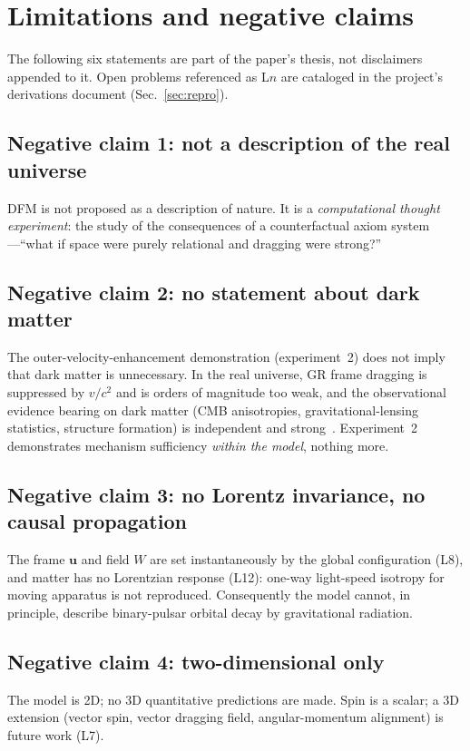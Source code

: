\documentclass[aps,reprint,amsmath,amssymb,nofootinbib,superscriptaddress,floatfix]{revtex4-2}
\newcommand{\vect}[1]{\bm{#1}}
\begin{document}
\section{Limitations and negative claims}
\label{sec:negative}

The following six statements are part of the paper's thesis, not
disclaimers appended to it.
Open problems referenced as L$n$ are cataloged in the project's
derivations document (Sec.~\ref{sec:repro}).

\subsection{Negative claim 1: not a description of the real universe}
DFM is not proposed as a description of nature.
It is a \emph{computational thought experiment}: the study of the
consequences of a
counterfactual axiom system---``what if space were purely relational
and dragging were strong?''

\subsection{Negative claim 2: no statement about dark matter}
The outer-velocity-enhancement demonstration (experiment~2) does not
imply that dark matter is unnecessary.
In the real universe, GR frame dragging is suppressed by $v/c^2$ and is
orders of magnitude too weak, and the observational evidence bearing on
dark matter (CMB anisotropies, gravitational-lensing statistics,
structure formation) is independent and
strong~\cite{Planck2018}.
Experiment~2 demonstrates mechanism sufficiency \emph{within the
model}, nothing more.

\subsection{Negative claim 3: no Lorentz invariance, no causal
propagation}
The frame $\vect{u}$ and field $W$ are set instantaneously by the
global configuration (L8), and matter has no Lorentzian response
(L12): one-way light-speed isotropy for moving apparatus is not
reproduced.
Consequently the model cannot, in principle, describe binary-pulsar
orbital decay by gravitational radiation.

\subsection{Negative claim 4: two-dimensional only}
The model is 2D; no 3D quantitative predictions are made.
Spin is a scalar; a 3D extension (vector spin, vector dragging field,
angular-momentum alignment) is future work (L7).
\end{document}
